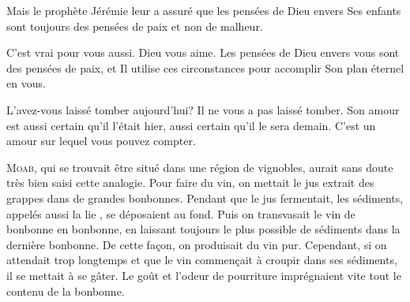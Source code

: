 Mais le prophète Jérémie leur a assuré que les pensées de Dieu envers
 Ses enfants sont toujours des pensées de paix et non de malheur. 

C'est vrai pour vous aussi. Dieu vous aime.
 Les pensées de Dieu envers vous sont des pensées de paix,
 et Il utilise ces circonstances pour accomplir Son plan éternel en vous. 

L'avez-vous laissé tomber aujourd'hui? Il ne vous a pas laissé tomber.
 Son amour est aussi certain qu'il l'était hier,
 aussi certain qu'il le sera demain.
 C'est un amour sur lequel vous pouvez compter. 

\dvrule









\lettrine{M}{oab,} qui se trouvait être situé
 dans une région de vignobles, aurait sans doute très bien saisi
 cette analogie. Pour faire du vin, on mettait le jus extrait des grappes
 dans de grandes bonbonnes. Pendant que le jus fermentait, les sédiments,
 appelés aussi \Og la lie \Fg{}, se déposaient au fond.
 Puis on transvasait le vin de bonbonne en bonbonne, en laissant toujours
 le plus possible de sédiments dans la dernière bonbonne.
 De cette fa\c{c}on, on produisait du vin pur.
 Cependant, si on attendait trop longtemps et que le vin commen\c{c}ait à croupir
 dans ses sédiments, il se mettait à se gâter.
 Le goût et l'odeur de pourriture imprégnaient
 vite tout le contenu de la bonbonne. 

